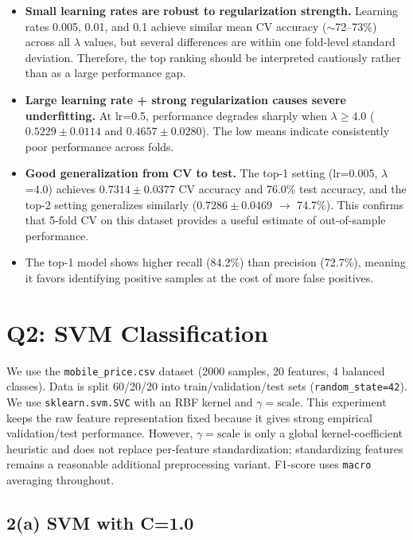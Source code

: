 \documentclass[11pt]{article}
\begin{document}
\begin{itemize}
    \item \textbf{Small learning rates are robust to regularization strength.} Learning rates 0.005, 0.01, and 0.1 achieve similar mean CV accuracy ($\sim$72--73\%) across all $\lambda$ values, but several differences are within one fold-level standard deviation. Therefore, the top ranking should be interpreted cautiously rather than as a large performance gap.
    \item \textbf{Large learning rate + strong regularization causes severe underfitting.} At lr=0.5, performance degrades sharply when $\lambda \geq 4.0$ ($0.5229 \pm 0.0114$ and $0.4657 \pm 0.0280$). The low means indicate consistently poor performance across folds.
    \item \textbf{Good generalization from CV to test.} The top-1 setting (lr=0.005, $\lambda$=4.0) achieves $0.7314 \pm 0.0377$ CV accuracy and 76.0\% test accuracy, and the top-2 setting generalizes similarly ($0.7286 \pm 0.0469$ $\to$ 74.7\%). This confirms that 5-fold CV on this dataset provides a useful estimate of out-of-sample performance.
    \item The top-1 model shows higher recall (84.2\%) than precision (72.7\%), meaning it favors identifying positive samples at the cost of more false positives.
\end{itemize}

\section{Q2: SVM Classification}

We use the \texttt{mobile\_price.csv} dataset (2000 samples, 20 features, 4 balanced classes). Data is split 60/20/20 into train/validation/test sets (\texttt{random\_state=42}). We use \texttt{sklearn.svm.SVC} with an RBF kernel and $\gamma=\text{scale}$. This experiment keeps the raw feature representation fixed because it gives strong empirical validation/test performance. However, $\gamma=\text{scale}$ is only a global kernel-coefficient heuristic and does not replace per-feature standardization; standardizing features remains a reasonable additional preprocessing variant. F1-score uses \texttt{macro} averaging throughout.

\subsection{2(a) SVM with C=1.0}
\end{document}
